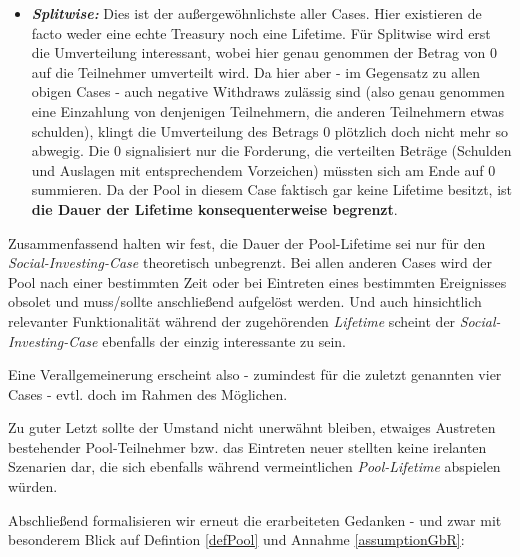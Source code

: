 \begin{itemize}
  \item \textbf{\textit{Splitwise:}} Dies ist der außergewöhnlichste aller Cases. Hier existieren de facto weder eine echte Treasury noch eine Lifetime. Für Splitwise wird erst die Umverteil\-ung interessant, wobei hier genau genommen der Betrag von 0 auf die Teilnehmer umverteilt wird. Da hier aber - im Gegensatz zu allen obigen Cases - auch negative Withdraws zulässig sind (also genau genommen eine Einzahlung von denjenigen Teilnehmern, die anderen Teilnehmern etwas schulden), klingt die Umverteilung des Betrags 0 plötzlich doch nicht mehr so abwegig. Die 0 signalisiert nur die Forderung, die verteilten Beträge (Schulden und Auslagen mit entsprechendem Vorzeichen) müssten sich am Ende auf 0 summieren. Da der Pool in diesem Case faktisch gar keine Lifetime besitzt, ist \textbf{die Dauer der Lifetime konsequenterweise begrenzt}.
\end{itemize}

\vspace{0.3cm}

Zusammenfassend halten wir fest, die Dauer der Pool-Lifetime sei nur für den \textit{Social-Investing-Case} theoretisch unbegrenzt. Bei allen anderen Cases wird der Pool nach einer bestimmten Zeit oder bei Eintreten eines bestimmten Ereignisses obsolet und muss/sollte anschließend aufgelöst werden. Und auch hinsichtlich relevanter Funktionalität während der zugehörenden \textit{Lifetime} scheint der \textit{Social-Investing-Case} ebenfalls der einzig interessante zu sein. 

\vspace{0.1cm}

Eine Verallgemeinerung erscheint also - zumindest für die zuletzt genannten vier Cases - evtl. doch im Rahmen des Möglichen. 

\vspace{0.3cm}

Zu guter Letzt sollte der Umstand nicht unerwähnt bleiben, etwaiges Austreten bestehender Pool-Teilnehmer bzw. das Eintreten neuer stellten keine irelanten Szenarien dar, die sich ebenfalls während vermeintlichen \textit{Pool-Lifetime} abspielen würden.

\vspace{0.3cm}

Abschließend formalisieren wir erneut die erarbeiteten Gedanken - und zwar mit besonderem Blick auf Defintion \ref{defPool} und Annahme \ref{assumptionGbR}: 

\vspace{0.2cm}

